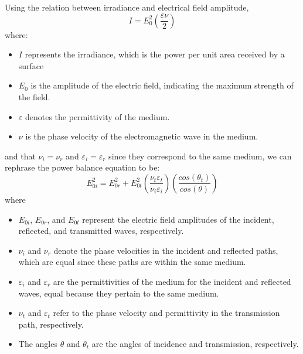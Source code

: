 Using the relation between irradiance and electrical field amplitude, 
\begin{equation}\label{eq: definition of irradiance}
I = E_{0}^2(\frac{\varepsilon \nu}{2})
\end{equation}
where:
\begin{itemize}
    \item $I$ represents the irradiance, which is the power per unit area received by a surface
    \item $E_0$ is the amplitude of the electric field, indicating the maximum strength of the field.
    \item $\varepsilon$ denotes the permittivity of the medium.
    \item $\nu$ is the phase velocity of the electromagnetic wave in the medium.
\end{itemize}
and that $\nu_i = \nu_r$ and $\varepsilon_i = \varepsilon_r$ since they correspond to the same medium, we can rephrase the power balance equation to be:
\begin{equation}
E_{0i}^2 = E_{0r}^2 + E_{0t}^2\left(\frac{\nu_t\varepsilon_t}{\nu_i\varepsilon_i}\right) \left(\frac{cos(\theta_t)}{cos(\theta)} \right)
\end{equation}
where
\begin{itemize}
    \item $E_{0i}$, $E_{0r}$, and $E_{0t}$ represent the electric field amplitudes of the incident, reflected, and transmitted waves, respectively.
    \item $\nu_i$ and $\nu_r$ denote the phase velocities in the incident and reflected paths, which are equal since these paths are within the same medium.
    \item $\varepsilon_i$ and $\varepsilon_r$ are the permittivities of the medium for the incident and reflected waves, equal because they pertain to the same medium.
    \item $\nu_t$ and $\varepsilon_t$ refer to the phase velocity and permittivity in the transmission path, respectively.
    \item The angles $\theta$ and $\theta_t$ are the angles of incidence and transmission, respectively.
\end{itemize}

